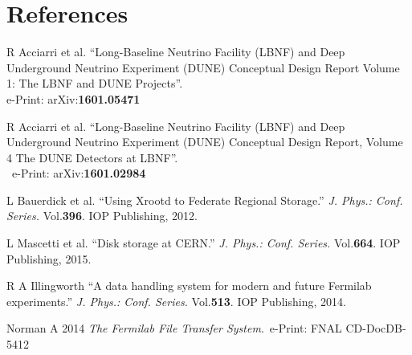 \documentclass[a4paper]{jpconf}
\begin{document}
\section*{References}
\begin{thebibliography}{9}

R Acciarri et al.
``Long-Baseline Neutrino Facility (LBNF) and Deep Underground Neutrino Experiment (DUNE) Conceptual Design Report Volume 1: The LBNF and DUNE Projects''.\\ e-Print: arXiv:\textbf{1601.05471}

R Acciarri et al.
``Long-Baseline Neutrino Facility (LBNF) and Deep Underground Neutrino Experiment (DUNE) Conceptual Design Report, Volume 4 The DUNE Detectors at LBNF''.\\~e-Print: arXiv:\textbf{1601.02984}


L Bauerdick et al. ``Using Xrootd to Federate Regional Storage.'' \textit{J. Phys.: Conf. Series.} Vol.\textbf{396}. IOP Publishing, 2012.



 L Mascetti et al. ``Disk storage at CERN.'' \textit{J. Phys.: Conf. Series.} Vol.\textbf{664}. IOP Publishing, 2015.



R A Illingworth ``A data handling system for modern and future Fermilab experiments.''  \textit{J. Phys.: Conf. Series.} Vol.\textbf{513}. IOP Publishing, 2014.


Norman A 2014 \textit{The Fermilab File Transfer System}.~e-Print: FNAL CD-DocDB-5412


\end{thebibliography}
\end{document}
